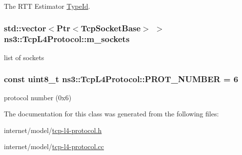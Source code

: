 The R\+TT Estimator \hyperlink{classns3_1_1TypeId}{Type\+Id}. 

\subsubsection[{\texorpdfstring{m\+\_\+sockets}{m_sockets}}]{\setlength{\rightskip}{0pt plus 5cm}std\+::vector$<${\bf Ptr}$<${\bf Tcp\+Socket\+Base}$>$ $>$ ns3\+::\+Tcp\+L4\+Protocol\+::m\+\_\+sockets\hspace{0.3cm}{\ttfamily [private]}}\hypertarget{classns3_1_1TcpL4Protocol_a7f0bde5144a1bb7594e4cf366669bcbc}{}\label{classns3_1_1TcpL4Protocol_a7f0bde5144a1bb7594e4cf366669bcbc}


list of sockets 

\subsubsection[{\texorpdfstring{P\+R\+O\+T\+\_\+\+N\+U\+M\+B\+ER}{PROT_NUMBER}}]{\setlength{\rightskip}{0pt plus 5cm}const uint8\+\_\+t ns3\+::\+Tcp\+L4\+Protocol\+::\+P\+R\+O\+T\+\_\+\+N\+U\+M\+B\+ER = 6\hspace{0.3cm}{\ttfamily [static]}}\hypertarget{classns3_1_1TcpL4Protocol_ac6c1cee44ae21227e755678bb52dbc89}{}\label{classns3_1_1TcpL4Protocol_ac6c1cee44ae21227e755678bb52dbc89}


protocol number (0x6) 



The documentation for this class was generated from the following files\+:\begin{DoxyCompactItemize}
\item 
internet/model/\hyperlink{tcp-l4-protocol_8h}{tcp-\/l4-\/protocol.\+h}\item 
internet/model/\hyperlink{tcp-l4-protocol_8cc}{tcp-\/l4-\/protocol.\+cc}\end{DoxyCompactItemize}

